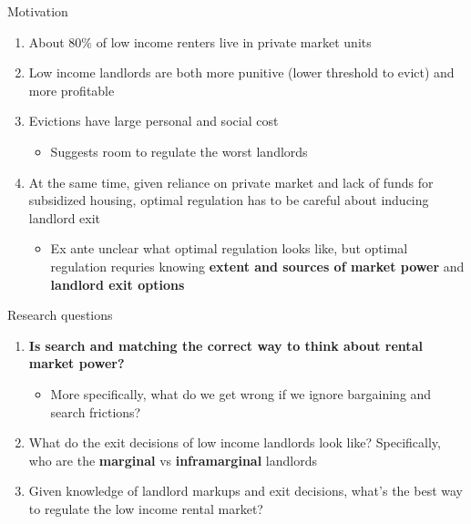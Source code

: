 \documentclass[10pt, xcolor=dvipsnames]{beamer}
\begin{document}
\begin{frame}{Motivation}
    \begin{enumerate}
        \item About 80\% of low income renters live in private market units \parencite{jchs_2024, nhpd2024profiles}
        \pause
        \item Low income landlords are both more punitive (lower threshold to evict) and more profitable \parencite{Desmond_2019, Eisfeldt_2015,Damen_2025}
        \item Evictions have large personal and social cost \parencite{desmond-evicted,humphries2025, collison-et-al-2023}
        \begin{itemize}
            \item Suggests room to regulate the worst landlords
        \end{itemize}
        \pause
        \item At the same time, given reliance on private market and lack of funds for subsidized housing, optimal regulation has to be careful about inducing landlord exit
        \begin{itemize}
            \item Ex ante unclear what optimal regulation looks like, but optimal regulation requries knowing \textbf{extent and sources of market power} and \textbf{landlord exit options}
        \end{itemize}
    \end{enumerate}

\end{frame}

\begin{frame}{Research questions}

\begin{enumerate}
    \item \textbf{Is search and matching the correct way to think about rental market power?}
    \begin{itemize}
        \item More specifically, what do we get wrong if we ignore bargaining and search frictions?
    \end{itemize}
    \pause
    \item What do the exit decisions of low income landlords look like? Specifically, who are the \textbf{marginal} vs \textbf{inframarginal} landlords
    \pause
    \item Given knowledge of landlord markups and exit decisions, what's the best way to regulate the low income rental market?
\end{enumerate}

\end{frame}
\end{document}
